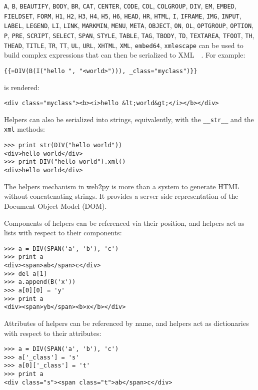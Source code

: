 \documentclass[justified,sixbynine,notoc]{tufte-book}
\def\ft{\small\tt}
\def\inxx#1{\index{#1}}
\begin{document}
\begin{fullwidth}
{\ft A},  {\ft B},  {\ft BEAUTIFY},  {\ft BODY},  {\ft BR},  {\ft CAT},  {\ft CENTER},  {\ft CODE},  {\ft COL}, {\ft COLGROUP}, {\ft DIV},  {\ft EM},  {\ft EMBED},  {\ft FIELDSET},  {\ft FORM},  {\ft H1},  {\ft H2},  {\ft H3},  {\ft H4},  {\ft H5},  {\ft H6},  {\ft HEAD},  {\ft HR},  {\ft HTML},  {\ft I},  {\ft IFRAME},  {\ft IMG},  {\ft INPUT},  {\ft LABEL},  {\ft LEGEND},  {\ft LI},  {\ft LINK},  {\ft MARKMIN},  {\ft MENU},  {\ft META},  {\ft OBJECT},  {\ft ON},  {\ft OL},  {\ft OPTGROUP},  {\ft OPTION},  {\ft P},  {\ft PRE},  {\ft SCRIPT},  {\ft SELECT},  {\ft SPAN},  {\ft STYLE},  {\ft TABLE},  {\ft TAG},  {\ft TBODY},  {\ft TD},  {\ft TEXTAREA},  {\ft TFOOT},  {\ft TH},  {\ft THEAD},  {\ft TITLE},  {\ft TR},  {\ft TT}, {\ft UL},   {\ft URL},  {\ft XHTML},  {\ft XML},  {\ft embed64},  {\ft xmlescape}
\noindent can be used to build complex expressions that can then be serialized to XML~\cite{xml-w}~\cite{xml-o}. For example:
\begin{lstlisting}[keywords={}]
{{=DIV(B(I("hello ", "<world>"))), _class="myclass")}}
\end{lstlisting}
\noindent is rendered:
\begin{lstlisting}[keywords={}]
<div class="myclass"><b><i>hello &lt;world&gt;</i></b></div>
\end{lstlisting}

Helpers can also be serialized into strings, equivalently, with the {\ft \_\_str\_\_} and the {\ft xml} methods:

\begin{lstlisting}
>>> print str(DIV("hello world"))
<div>hello world</div>
>>> print DIV("hello world").xml()
<div>hello world</div>
\end{lstlisting}

\inxx{Document Object Model (DOM)}
The helpers mechanism in web2py is more than a system to generate HTML without concatenating strings. It provides a server-side representation of the Document Object Model (DOM).

Components of helpers can be referenced via their position, and helpers act as lists with respect to their components:
\begin{lstlisting}
>>> a = DIV(SPAN('a', 'b'), 'c')
>>> print a
<div><span>ab</span>c</div>
>>> del a[1]
>>> a.append(B('x'))
>>> a[0][0] = 'y'
>>> print a
<div><span>yb</span><b>x</b></div>
\end{lstlisting}

Attributes of helpers can be referenced by name, and helpers act as dictionaries with respect to their attributes:
\begin{lstlisting}
>>> a = DIV(SPAN('a', 'b'), 'c')
>>> a['_class'] = 's'
>>> a[0]['_class'] = 't'
>>> print a
<div class="s"><span class="t">ab</span>c</div>
\end{lstlisting}


\end{fullwidth}
\end{document}
